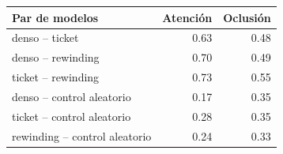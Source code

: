 \begin{tabular}{@{}lrr@{}}\toprule
Par de modelos & Atenci\'on & Oclusi\'on \\\midrule
denso -- ticket & 0.63 & 0.48 \\
denso -- rewinding & 0.70 & 0.49 \\
ticket -- rewinding & 0.73 & 0.55 \\
\midrule
denso -- control aleatorio & 0.17 & 0.35 \\
ticket -- control aleatorio & 0.28 & 0.35 \\
rewinding -- control aleatorio & 0.24 & 0.33 \\
\bottomrule\end{tabular}
